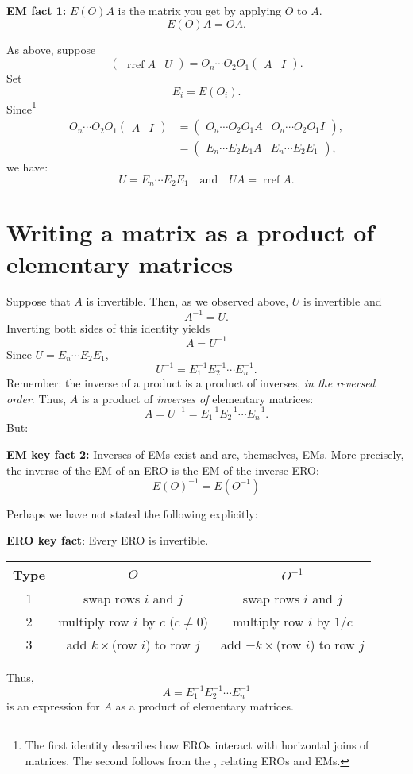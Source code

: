 \documentclass[17pt]{amsart}
\DeclareMathOperator{\rref}{rref}
\begin{document}
\bigskip\textbf{EM fact 1:} $E(O)A$ is the matrix you get by applying $O$ to $A$.
\[
E(O)A=OA.
\]

As above, suppose
\[
\left(
\begin{array}{c|c}
\rref A&U
\end{array}
\right)=O_n\cdots O_2O_1\left(
\begin{array}{c|c}
A&I
\end{array}
\right).
\]
Set
\[
E_i = E(O_i).
\]
Since\footnote{The first identity describes how EROs interact with horizontal joins of matrices. The second follows from the , relating EROs and EMs.}
\begin{align*}
O_n\cdots O_2O_1\left(
\begin{array}{c|c}
A&I
\end{array}
\right)&=
\left(
\begin{array}{c|c}
O_n\cdots O_2O_1A&O_n\cdots O_2O_1I
\end{array}
\right),\\
&= \left(\begin{array}{c|c}
E_n\cdots E_2E_1A&
E_n\cdots E_2E_1
\end{array}\right),
\end{align*}
we have:
\[
U=E_n\cdots E_2E_1\quad\text{and}\quad UA=\rref A.
\]

\section{Writing a matrix as a product of elementary matrices}
Suppose that $A$ is invertible.
Then, as we observed above, $U$ is invertible and
\[
A^{-1}=U.
\]
Inverting both sides of this identity yields
\[
A=U^{-1}
\]
Since $U=E_n\cdots E_2E_1$,
\[
U^{-1}=E_1^{-1}E_2^{-1}\cdots E_n^{-1}.
\]
Remember: the inverse of a product is a product of inverses, \emph{in the reversed order}.
Thus, $A$ is a product of \emph{inverses of} elementary matrices:
\[
A = U^{-1}=E_1^{-1}E_2^{-1}\cdots E_n^{-1}.
\]
But:

\bigskip\textbf{EM key fact 2:} Inverses of EMs exist and are, themselves, EMs. More precisely, the inverse of the EM of an ERO is the EM of the inverse ERO:
\[
E(O)^{-1} = E(O^{-1})
\]

Perhaps we have not stated the following explicitly:

\bigskip\textbf{ERO key fact}: Every ERO is invertible.

\begin{center}
\begin{tabular}{c|c|c}
Type & $O$ & $O^{-1}$\\ \hline
1& swap rows $i$ and $j$ & swap rows $i$ and $j$\\
2& multiply row $i$ by $c$ ($c\neq 0$) & multiply row $i$ by $1/c$\\
3& add $k\times$(row $i$) to row $j$& add $-k\times$(row $i$) to row $j$
\end{tabular}
\end{center}

Thus, 
\[
A=E_1^{-1}E_2^{-1}\cdots E_n^{-1}
\]
is an expression for $A$ as a product of elementary matrices.
\end{document}
